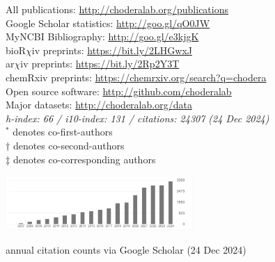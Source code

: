 \documentclass[10pt]{article}
\begin{document}

\begin{minipage}[t]{3.3in}
All publications: \href{http://choderalab.org/publications}{http://choderalab.org/publications} \\
Google Scholar statistics: \href{http://goo.gl/qO0JW}{http://goo.gl/qO0JW} \hspace{0.2in} \\
MyNCBI Bibliography: \href{http://goo.gl/e3kjgK}{http://goo.gl/e3kjgK} \\
bioR$\chi$iv preprints: \href{https://bit.ly/2LHGwxJ}{https://bit.ly/2LHGwxJ} \\
ar$\chi$iv preprints: \href{https://bit.ly/2Rp2Y3T}{https://bit.ly/2Rp2Y3T} \\
chemRxiv preprints: \href{https://chemrxiv.org/search?q=chodera}{https://chemrxiv.org/search?q=chodera} \\
Open source software: \href{http://github.com/choderalab}{http://github.com/choderalab}\\
Major datasets: \href{http://choderalab.org/data}{http://choderalab.org/data} \\
{\small \it h-index: 66 / i10-index: 131 / citations: 24307 (24 Dec 2024)} \\
{\scriptsize $^*$ denotes co-first-authors \\
$\dag$ denotes co-second-authors \\
$\ddag$ denotes co-corresponding authors}
\end{minipage}
\quad
\begin{minipage}[t]{3in}

\includegraphics[width=2.8in,valign=t]{thumbnails/citations-2024-12-24.pdf}

\vspace{0.05in}
{\small annual citation counts via Google Scholar (24 Dec 2024)}
\end{minipage}



\end{document}
